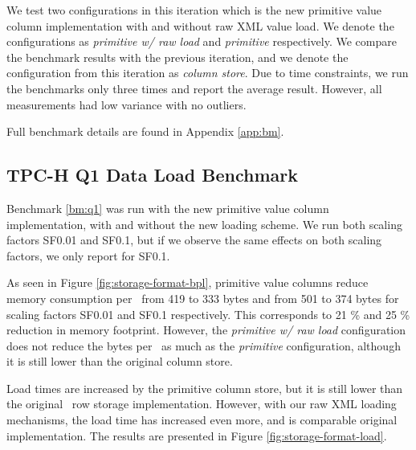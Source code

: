 We test two configurations in this iteration which is the new primitive value column implementation with and without raw XML value load. We denote the configurations as \textit{primitive w/ raw load} and \textit{primitive} respectively. We compare the benchmark results with the previous iteration, and we denote the configuration from this iteration as \textit{column store}. Due to time constraints, we run the benchmarks only three times and report the average result. However, all measurements had low variance with no outliers.

Full benchmark details are found in Appendix \ref{app:bm}.

\subsection{TPC-H Q1 Data Load Benchmark}
\label{sub:storage-format-tpch-results}

Benchmark \ref{bm:q1} was run with the new primitive value column implementation, with and without the new loading scheme. We run both scaling factors SF0.01 and SF0.1, but if we observe the same effects on both scaling factors, we only report for SF0.1.

As seen in Figure \ref{fig:storage-format-bpl}, primitive value columns reduce memory consumption per \lineitem~from 419 to 333 bytes and from 501 to 374 bytes for scaling factors SF0.01 and SF0.1 respectively. This corresponds to 21 \% and 25 \% reduction in memory footprint. However, the \textit{primitive w/ raw load} configuration does not reduce the bytes per \lineitem~as much as the \textit{primitive} configuration, although it is still lower than the original column store.


Load times are increased by the primitive column store, but it is still lower than the original \gap~row storage implementation. However, with our raw XML loading mechanisms, the load time has increased even more, and is comparable original implementation. The results are presented in Figure \ref{fig:storage-format-load}. 

